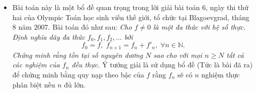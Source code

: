\begin{bt}
{\begin{nx}
\begin{itemize}
			và $$\frac{P'\left ( x \right )}{P\left ( x \right )}=\frac{1}{x-x_1}+\frac{1}{x-x_2}+\cdots+\frac{1}{x-x_n}. $$
		\item  Bài toán này là một bổ đề quan trọng trong lời giải bài toán $6$, ngày thi thứ hai của Olympic Toán học sinh viến thế giới, tổ chức tại Blagoevgrad, tháng $8$ năm $2007$. Bài toán đó như sau:
			{\em{Cho $f\neq 0$ là một đa thức với hệ số thực. Định nghĩa dãy đa thức $f_0,f_1,f_2,\dots$ bởi
			$$f_0=f,\,\,  f_{n+1}=f_{n}+f'_{n},\;\forall n\in \mathbb{N}.$$ 
			Chứng minh rằng tồn tại số nguyên dương $N$ sao cho với mọi $n\ge N$ tất cả các nghiệm của $f_n$ đều thực.}}
			Ý tưởng giải là sử dụng bổ đề (Tức là bài đã ra) để chứng minh bằng quy nạp theo bậc của $f$ rằng $f_n$ sẽ có $n$ nghiệm thực phân biệt nếu $n$ đủ lớn.
	\end{itemize}
		\end{nx}
	}
\end{bt}

